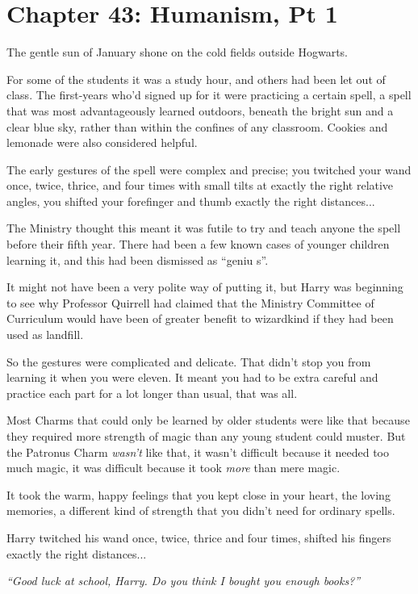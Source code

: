 \chapter{Chapter 43: Humanism, Pt 1}
The gentle sun of January shone on the cold fields outside Hogwarts.

For some of the students it was a study hour, and others had been let out of class. The first-years who'd signed up for it were practicing a certain spell, a spell that was most advantageously learned outdoors, beneath the bright sun and a clear blue sky, rather than within the confines of any classroom. Cookies and lemonade were also considered helpful.

The early gestures of the spell were complex and precise; you twitched your wand once, twice, thrice, and four times with small tilts at exactly the right relative angles, you shifted your forefinger and thumb exactly the right distances...

The Ministry thought this meant it was futile to try and teach anyone the spell before their fifth year. There had been a few known cases of younger children learning it, and this had been dismissed as ``geniu s''.

It might not have been a very polite way of putting it, but Harry was beginning to see why Professor Quirrell had claimed that the Ministry Committee of Curriculum would have been of greater benefit to wizardkind if they had been used as landfill.

So the gestures were complicated and delicate. That didn't stop you from learning it when you were eleven. It meant you had to be extra careful and practice each part for a lot longer than usual, that was all.

Most Charms that could only be learned by older students were like that because they required more strength of magic than any young student could muster. But the Patronus Charm \emph{wasn't} like that, it wasn't difficult because it needed too much magic, it was difficult because it took \emph{more} than mere magic.

It took the warm, happy feelings that you kept close in your heart, the loving memories, a different kind of strength that you didn't need for ordinary spells.

Harry twitched his wand once, twice, thrice and four times, shifted his fingers exactly the right distances...

\emph{``Good luck at school, Harry. Do you think I bought you enough books?''}


